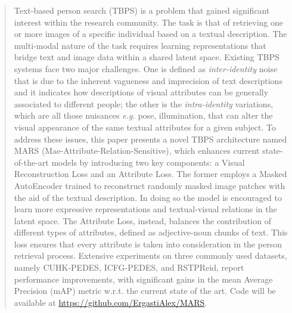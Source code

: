 \documentclass[acmsmall]{acmart}
\begin{document}
\begin{abstract}
Text-based person search (TBPS) is a problem that gained significant interest within the research community. The task is that of retrieving one or more images of a specific individual based on a textual description. The multi-modal nature of the task requires learning representations that bridge text and image data within a shared latent space. Existing TBPS systems face two major challenges. One is defined as \textit{inter-identity} noise that is due to the inherent vagueness and imprecision of text descriptions and it indicates how descriptions of visual attributes can be generally associated to different people; the other is the \textit{intra-identity} variations, which are all those nuisances \textit{e.g.} pose, illumination, that can alter the visual appearance of the same textual attributes for a given subject. To address these issues, this paper presents a novel TBPS architecture named MARS (Mae-Attribute-Relation-Sensitive), which enhances current state-of-the-art models by introducing two key components: a Visual Reconstruction Loss and an Attribute Loss. The former employs a Masked AutoEncoder trained to reconstruct randomly masked image patches with the aid of the textual description. In doing so the model is encouraged to learn more expressive representations and textual-visual relations in the latent space. 
The Attribute Loss, instead, balances the contribution of different types of attributes, defined as adjective-noun chunks of text. This loss ensures that every attribute is taken into consideration in the person retrieval process. %
Extensive experiments on three commonly used datasets, namely CUHK-PEDES, ICFG-PEDES, and RSTPReid, report performance improvements, with significant gains in the mean Average Precision (mAP) metric w.r.t. the current state of the art. Code will be available at \href{https://github.com/ErgastiAlex/MARS}{https://github.com/ErgastiAlex/MARS}.
\end{abstract}


\end{document}
